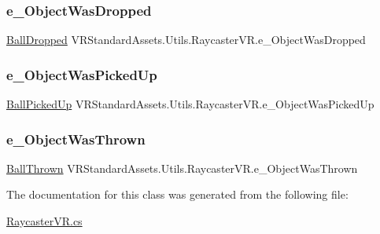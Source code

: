 \subsubsection{\texorpdfstring{e\+\_\+\+Object\+Was\+Dropped}{e\_ObjectWasDropped}}
{\footnotesize\ttfamily \mbox{\hyperlink{class_v_r_standard_assets_1_1_utils_1_1_raycaster_v_r_afa0e8c643d924f0f008364e153844e5f}{Ball\+Dropped}} V\+R\+Standard\+Assets.\+Utils.\+Raycaster\+V\+R.\+e\+\_\+\+Object\+Was\+Dropped\hspace{0.3cm}{\ttfamily [static]}}

\mbox{\label{class_v_r_standard_assets_1_1_utils_1_1_raycaster_v_r_ad264493543b631d078818d28706e21bb}} 
\subsubsection{\texorpdfstring{e\+\_\+\+Object\+Was\+Picked\+Up}{e\_ObjectWasPickedUp}}
{\footnotesize\ttfamily \mbox{\hyperlink{class_v_r_standard_assets_1_1_utils_1_1_raycaster_v_r_a85241158337110726e61258a3237752e}{Ball\+Picked\+Up}} V\+R\+Standard\+Assets.\+Utils.\+Raycaster\+V\+R.\+e\+\_\+\+Object\+Was\+Picked\+Up\hspace{0.3cm}{\ttfamily [static]}}

\mbox{\label{class_v_r_standard_assets_1_1_utils_1_1_raycaster_v_r_a62d35bb4bf621e1d9b41991805091848}} 
\subsubsection{\texorpdfstring{e\+\_\+\+Object\+Was\+Thrown}{e\_ObjectWasThrown}}
{\footnotesize\ttfamily \mbox{\hyperlink{class_v_r_standard_assets_1_1_utils_1_1_raycaster_v_r_a208df26f1139ba566bd76ab13e654fac}{Ball\+Thrown}} V\+R\+Standard\+Assets.\+Utils.\+Raycaster\+V\+R.\+e\+\_\+\+Object\+Was\+Thrown\hspace{0.3cm}{\ttfamily [static]}}



The documentation for this class was generated from the following file\+:\begin{DoxyCompactItemize}
\item 
\mbox{\hyperlink{_raycaster_v_r_8cs}{Raycaster\+V\+R.\+cs}}\end{DoxyCompactItemize}
